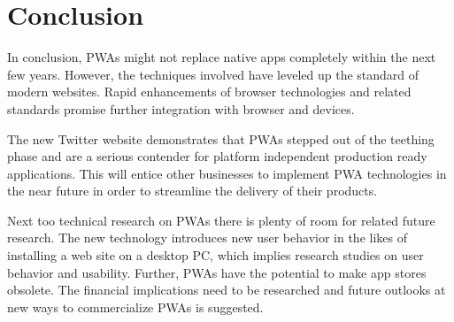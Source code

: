 \chapter{Conclusion}

In conclusion, PWAs might not replace native apps completely within the next few years. However, the techniques involved have leveled up the standard of modern websites. Rapid enhancements of browser technologies and related standards promise further integration with browser and devices.

The new Twitter website demonstrates that PWAs stepped out of the teething phase and are a serious contender for platform independent production ready applications. This will entice other businesses to implement PWA technologies in the near future in order to streamline the delivery of their products.

Next too technical research on PWAs there is plenty of room for related future research. The new technology introduces new user behavior in the likes of installing a web site on a desktop PC, which implies research studies on user behavior and usability. Further, PWAs have the potential to make app stores obsolete. The financial implications need to be researched and future outlooks at new ways to commercialize PWAs is suggested.

